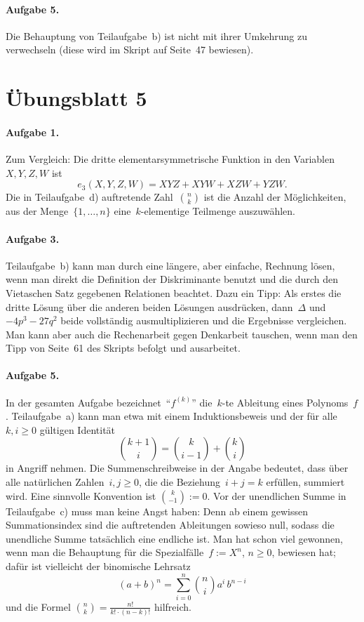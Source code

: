 \documentclass{../algblatt}
\begin{document}
\paragraph{Aufgabe 5.} Die Behauptung von Teilaufgabe~b) ist nicht mit ihrer
Umkehrung zu verwechseln (diese wird im Skript auf Seite~47 bewiesen).


\section*{Übungsblatt 5}

\paragraph{Aufgabe 1.} Zum Vergleich: Die dritte elementarsymmetrische Funktion
in den Variablen~$X,Y,Z,W$ ist
\[ e_3(X,Y,Z,W) = XYZ + XYW + XZW + YZW. \]
Die in Teilaufgabe~d) auftretende Zahl~$\binom{n}{k}$
ist die Anzahl der Möglichkeiten, aus der Menge~$\{ 1,\ldots,n \}$
eine~$k$-elementige Teilmenge auszuwählen.

\paragraph{Aufgabe 3.} Teilaufgabe~b) kann man durch eine längere, aber
einfache, Rechnung lösen, wenn man direkt die Definition der Diskriminante
benutzt und die durch den Vietaschen Satz gegebenen Relationen beachtet. Dazu
ein Tipp: Als erstes die dritte Lösung über die anderen beiden Lösungen
ausdrücken, dann~$\Delta$ und~$-4p^3 - 27q^2$ beide vollständig
ausmultiplizieren und die Ergebnisse vergleichen. Man kann aber auch die
Rechenarbeit gegen Denkarbeit tauschen, wenn man den Tipp von Seite~61 des
Skripts befolgt und ausarbeitet.

\paragraph{Aufgabe 5.} In der gesamten Aufgabe bezeichnet~"`$f^{(k)}$"'
die~$k$-te Ableitung eines Polynoms~$f$. Teilaufgabe~a) kann man etwa mit einem
Induktionsbeweis und der für alle~$k,i \geq 0$ gültigen Identität
\[ \binom{k+1}{i} = \binom{k}{i-1} + \binom{k}{i} \]
in Angriff nehmen. Die Summenschreibweise in der Angabe bedeutet, dass über
alle natürlichen Zahlen~$i,j \geq 0$, die die Beziehung~$i + j = k$ erfüllen, summiert
wird. Eine sinnvolle Konvention ist $\binom{k}{-1} := 0$.
Vor der unendlichen Summe in Teilaufgabe~c) muss man keine
Angst haben: Denn ab einem gewissen Summationsindex sind die auftretenden
Ableitungen sowieso null, sodass die unendliche Summe tatsächlich eine endliche
ist. Man hat schon viel gewonnen, wenn man die Behauptung für die
Spezialfälle~$f := X^n$, $n \geq 0$, bewiesen hat; dafür ist vielleicht der
binomische Lehrsatz
\[ (a + b)^n = \sum_{i=0}^n \binom{n}{i} a^i \, b^{n-i} \]
und die Formel $\binom{n}{k} = \frac{n!}{k! \cdot (n-k)!}$ hilfreich.
\end{document}
